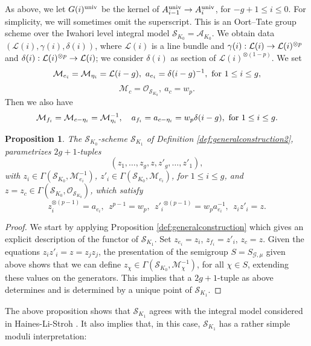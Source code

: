 \documentclass[reqno, 10pt]{amsart}
\makeatletter
\newcommand{\CA}{\ensuremath{\mathcal {A}}\xspace}
\newcommand{\CG}{\ensuremath{\mathcal {G}}\xspace}
\newcommand{\CL}{\ensuremath{\mathcal {L}}\xspace}
\newcommand{\CM}{\ensuremath{\mathcal {M}}\xspace}
\newcommand{\CO}{\ensuremath{\mathcal {O}}\xspace}
\newcommand{\CS}{\ensuremath{\mathcal {S}}\xspace}
\newtheorem{proposition}[subsubsection]{Proposition}
\theoremstyle{definition}
\numberwithin{equation}{subsection}
\numberwithin{subsubsection}{subsection}
\renewcommand{\to}{%
   \ifbool{@display}{\longrightarrow}{\rightarrow}%
   }
\makeatother
\begin{document}
As above, we let $G(i)^{\rm univ}$ be the kernel of $A^{\rm univ}_{i-1}\to A^{\rm univ}_{i}$, for $-g+1\leq i\leq 0$. For simplicity, we will sometimes omit the superscript. This is an Oort--Tate group scheme over the Iwahori level integral model $\CS_{K_0}=\CA_{K_0}$. We obtain data $(\CL(i), \gamma(i), \delta(i))$, where $\CL(i)$ is a line bundle and $\gamma(i): \CL(i)\to \CL(i)^{\otimes p}$ and  $\delta(i): \CL(i)^{\otimes p}\to \CL(i)$; we consider $\delta(i)$ as section of $\CL(i)^{\otimes(1-p)}$. We set  
\[
 \CM_{e_i}=\CM_{\eta_i}=\CL(i-g), \  a_{e_i}=\delta({i-g})^{-1},\ \hbox{\rm for $1\leq i\leq g$}, 
\]
\[
\CM_{c}=\CO_{\CS_{K_0}}, \ a_{c}=w_p.
\]
Then we also have
\[
\CM_{f_i}=\CM_{c-\eta_i}=\CM_{\eta_i}^{-1},\quad a_{f_i}=a_{c-\eta_i}=w_p\delta({i-g}), \ \hbox{\rm for $1\leq i\leq g$}.
\]
\begin{proposition} The $\CS_{K_0}$-scheme $\CS_{K_1}$ of Definition \ref{def:generalconstruction2}, parametrizes $2g+1$-tuples 
\[
(z_1,\ldots, z_g, z, z'_g, \ldots, z'_1),
\]
 with  $z_i\in \Gamma(\CS_{K_0}, \CM^{-1}_{e_i})$, $z'_i\in \Gamma(\CS_{K_0}, \CM_{e_i})$, 
for $1\leq i\leq g$, and $z=z_c\in  
\Gamma(\CS_{K_0}, \CO_{\CS_{K_0}})$, which satisfy
\[
z_{i}^{\otimes(p-1)}=a_{e_i},  \  \ z^{p-1}=w_p,  \  \ {z'_i}^{\otimes(p-1)}=w_pa_{e_i}^{-1}, \ \ z_iz'_i=z.
\]
\end{proposition}

\begin{proof} We start by applying Proposition \ref{def:generalconstruction} which gives an explicit description of the functor of $\CS_{K_1}$.
Set $z_{e_i}=z_i$, $z_{f_i}=z'_i$, $z_c=z$. Given the equations $z_iz'_i=z=z_jz_j$, the presentation of the semigroup $S=S_{\CG,\mu}$ given above shows that we can define  $z_\chi\in \Gamma(\CS_{K_0}, \CM^{-1}_{\chi})$,  for all $\chi\in S$, extending these values on the generators. This implies that a $2g+1$-tuple as above determines and is determined by a unique point of $\CS_{K_1}$.
\end{proof}

The above proposition shows that   $\CS_{K_1}$ agrees with the integral model considered in Haines-Li-Stroh \cite{HLS}. 
It also implies that, in this case, $\CS_{K_1}$ has a rather simple moduli interpretation: 
 
\end{document}
